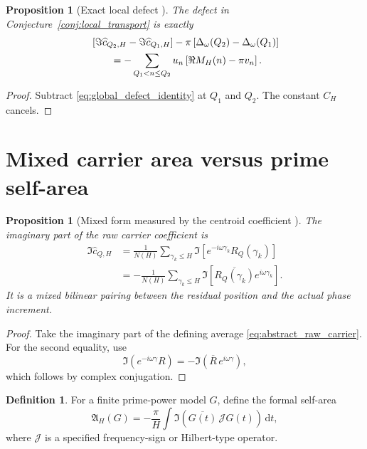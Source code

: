\documentclass[11pt]{amsart}
\numberwithin{equation}{section}
\theoremstyle{plain}
\newtheorem{proposition}[theorem]{Proposition}
\theoremstyle{definition}
\newtheorem{definition}[theorem]{Definition}
\theoremstyle{remark}
\newcommand{\1}{\mathbf{1}}
\newcommand{\dd}{\,\mathrm{d}}
\newcommand{\cJ}{\mathcal J}
\begin{document}
\begin{proposition}[Exact local defect {}]
\label{prop:local_defect}
The defect in Conjecture~\ref{conj:local_transport} is exactly
\begin{align}
&
\left[
\Im\widehat c_{Q_2,H}-\Im\widehat c_{Q_1,H}
\right]
-
\pi\left[
\Delta_\omega(Q_2)-\Delta_\omega(Q_1)
\right]
\notag
\\
&\qquad
=
-\sum_{Q_1<n\leq Q_2}
u_n\left[
\Re M_H(n)-\pi v_n
\right].
\label{eq:local_defect_identity}
\end{align}
\end{proposition}

\begin{proof}
Subtract \eqref{eq:global_defect_identity} at \(Q_1\) and \(Q_2\).
The constant \(C_H\) cancels.
\end{proof}

\section{Mixed carrier area versus prime self-area}
\label{sec:mixed_vs_self_area}


\begin{proposition}[Mixed form measured by the centroid coefficient {}]
\label{prop:mixed_area}
The imaginary part of the raw carrier coefficient is
\begin{align}
\Im\widehat c_{Q,H}
&=
\frac1{N(H)}
\sum_{\gamma_k\leq H}
\Im\left[
e^{-i\omega\gamma_k}R_Q(\gamma_k)
\right]
\label{eq:mixed_area_first}
\\
&=
-\frac1{N(H)}
\sum_{\gamma_k\leq H}
\Im\left[
\overline{R_Q(\gamma_k)}
e^{i\omega\gamma_k}
\right].
\label{eq:mixed_area_second}
\end{align}
It is a mixed bilinear pairing between the residual position and the
actual phase increment.
\end{proposition}

\begin{proof}
Take the imaginary part of the defining average
\eqref{eq:abstract_raw_carrier}.  For the second equality, use
\begin{equation}
\Im(e^{-i\omega\gamma}R)
=
-\Im(\overline R\,e^{i\omega\gamma}),
\label{eq:mixed_area_conjugation}
\end{equation}
which follows by complex conjugation.
\end{proof}

\begin{definition}
\label{def:prime_self_area}
For a finite prime-power model \(G\), define the formal self-area
\begin{equation}
\mathfrak A_H(G)
=
-\frac{\pi}{H}
\int
\Im\left(
\overline{G(t)}\,\cJ G(t)
\right)\dd t,
\label{eq:prime_self_area}
\end{equation}
where \(\cJ\) is a specified frequency-sign or Hilbert-type operator.
\end{definition}
\end{document}
